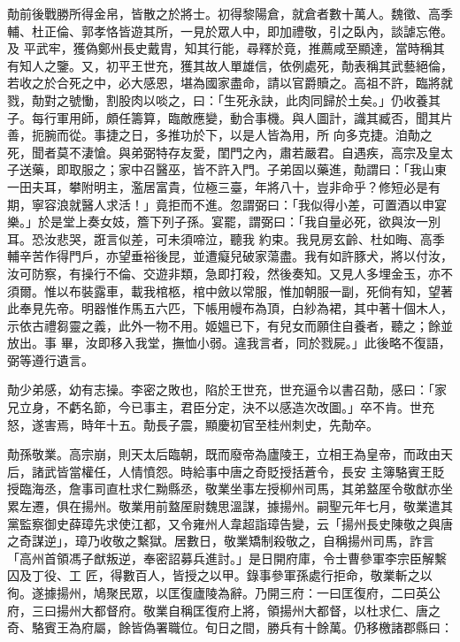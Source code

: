 \begin{pinyinscope}
 勣前後戰勝所得金帛，皆散之於將士。初得黎陽倉，就倉者數十萬人。魏徵、高季輔、杜正倫、郭孝恪皆遊其所，一見於眾人中，即加禮敬，引之臥內，談謔忘倦。及
 平武牢，獲偽鄭州長史戴胄，知其行能，尋釋於竟，推薦咸至顯達，當時稱其有知人之鑒。又，初平王世充，獲其故人單雄信，依例處死，勣表稱其武藝絕倫，若收之於合死之中，必大感恩，堪為國家盡命，請以官爵贖之。高祖不許，臨將就戮，勣對之號慟，割股肉以啖之，曰：「生死永訣，此肉同歸於土矣。」仍收養其子。每行軍用師，頗任籌算，臨敵應變，動合事機。與人圖計，識其臧否，聞其片善，扼腕而從。事捷之日，多推功於下，以是人皆為用，所
 向多克捷。洎勣之死，聞者莫不淒愴。與弟弼特存友愛，閨門之內，肅若嚴君。自遇疾，高宗及皇太子送藥，即取服之；家中召醫巫，皆不許入門。子弟固以藥進，勣謂曰：「我山東一田夫耳，攀附明主，濫居富貴，位極三臺，年將八十，豈非命乎？修短必是有期，寧容浪就醫人求活！」竟拒而不進。忽謂弼曰：「我似得小差，可置酒以申宴樂。」於是堂上奏女妓，簷下列子孫。宴罷，謂弼曰：「我自量必死，欲與汝一別耳。恐汝悲哭，誑言似差，可未須啼泣，聽我
 約束。我見房玄齡、杜如晦、高季輔辛苦作得門戶，亦望垂裕後昆，並遭癡兒破家蕩盡。我有如許豚犬，將以付汝，汝可防察，有操行不倫、交遊非類，急即打殺，然後奏知。又見人多埋金玉，亦不須爾。惟以布裝露車，載我棺柩，棺中斂以常服，惟加朝服一副，死倘有知，望著此奉見先帝。明器惟作馬五六匹，下帳用幔布為頂，白紗為裙，其中著十個木人，示依古禮芻靈之義，此外一物不用。姬媼已下，有兒女而願住自養者，聽之；餘並放出。事
 畢，汝即移入我堂，撫恤小弱。違我言者，同於戮屍。」此後略不復語，弼等遵行遺言。



 勣少弟感，幼有志操。李密之敗也，陷於王世充，世充逼令以書召勣，感曰：「家兄立身，不虧名節，今已事主，君臣分定，決不以感造次改圖。」卒不肯。世充怒，遂害焉，時年十五。勣長子震，顯慶初官至桂州刺史，先勣卒。



 勣孫敬業。高宗崩，則天太后臨朝，既而廢帝為廬陵王，立相王為皇帝，而政由天后，諸武皆當權任，人情憤怨。時給事中唐之奇貶授括蒼令，長安
 主簿駱賓王貶授臨海丞，詹事司直杜求仁黝縣丞，敬業坐事左授柳州司馬，其弟盩厔令敬猷亦坐累左遷，俱在揚州。敬業用前盩厔尉魏思溫謀，據揚州。嗣聖元年七月，敬業遣其黨監察御史薛璋先求使江都，又令雍州人韋超詣璋告變，云「揚州長史陳敬之與唐之奇謀逆」，璋乃收敬之繫獄。居數日，敬業矯制殺敬之，自稱揚州司馬，詐言「高州首領馮子猷叛逆，奉密詔募兵進討。」是日開府庫，令士曹參軍李宗臣解繫囚及丁役、工
 匠，得數百人，皆授之以甲。錄事參軍孫處行拒命，敬業斬之以徇。遂據揚州，鳩聚民眾，以匡復廬陵為辭。乃開三府：一曰匡復府，二曰英公府，三曰揚州大都督府。敬業自稱匡復府上將，領揚州大都督，以杜求仁、唐之奇、駱賓王為府屬，餘皆偽署職位。旬日之間，勝兵有十餘萬。仍移檄諸郡縣曰：




\end{pinyinscope}
